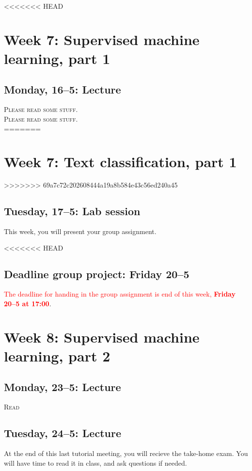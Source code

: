 <<<<<<< HEAD
\section*{Week 7: Supervised machine learning, part 1}
\subsection*{Monday, 16--5: Lecture}
\textsc{ Please read some stuff.}\\
\textsc{ Please read some stuff.}\\
=======
\section*{Week 7: Text classification, part 1}
\begin{itemize}
	\item{Watch: \url{https://www.youtube.com/watch?v=81vTqTz2pbM}
	\item{Read \cite{van_zoonen_social_2016}}
\end{itemize}
>>>>>>> 69a7c72c202608444a19a8b584e43c56ed240a45

\subsection*{Tuesday, 17--5: Lab session}
This week, you will present your group assignment. 

<<<<<<< HEAD
\subsection*{Deadline group project: Friday 20--5}
\textcolor{red}{The deadline for handing in the group assignment is end of this week, \textbf{Friday 20--5 at 17:00}}.


\section*{Week 8: Supervised machine learning,  part 2}

\subsection*{Monday, 23--5: Lecture}
\textsc{ Read \cite{van_zoonen_social_2016}}
\subsection*{Tuesday, 24--5: Lecture}
At the end of this last tutorial meeting, you will recieve the take-home exam. You will have time to read it in class, and ask questions if needed. \\

